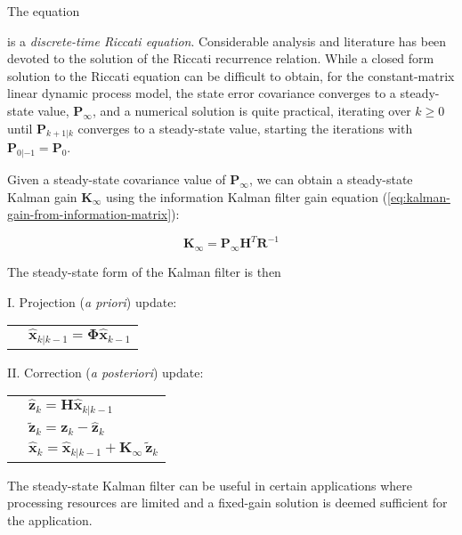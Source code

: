 The equation


is a \textit{discrete-time Riccati equation}. Considerable analysis and literature has
been devoted to the solution of the Riccati recurrence relation. While a closed form
solution to the Riccati equation can be difficult to obtain, for the constant-matrix
linear dynamic process model, the state error covariance converges to a steady-state
value, $\mathbf{P}_{\infty}$, and a numerical solution is quite practical, iterating
over $k \ge 0$ until $\mathbf{P}_{k+1|k}$ converges to a steady-state value, starting
the iterations with $\mathbf{P}_{0|-1} = \mathbf{P}_0$.

Given a steady-state covariance value of $\mathbf{P}_{\infty}$, we can obtain a
steady-state Kalman gain $\mathbf{K}_{\infty}$ using the information Kalman filter gain
equation (\ref{eq:kalman-gain-from-information-matrix}):

\begin{equation*}
    \mathbf{K}_{\infty} = \mathbf{P}_{\infty} \mathbf{H}^T \mathbf{R}^{-1}
\end{equation*}

The steady-state form of the Kalman filter is then

I. Projection (\textit{a priori}) update:

\begingroup
\renewcommand{\arraystretch}{1.25}
\begin{tabular}{l l}
\phantom{.} & $\hat{\mathbf{x}}_{k|k-1} = \mathbf{\Phi} \hat{\mathbf{x}}_{k-1}$
\end{tabular}
\endgroup

II. Correction (\textit{a posteriori}) update:

\begingroup
\renewcommand{\arraystretch}{1.25}
\begin{tabular}{l l}
\phantom{.} & $\hat{\mathbf{z}}_k = \mathbf{H} \hat{\mathbf{x}}_{k|k-1}$ \\
\phantom{.} & $\tilde{\mathbf{z}}_k = \mathbf{z}_k - \hat{\mathbf{z}}_k$ \\
\phantom{.} & $\hat{\mathbf{x}}_k = \hat{\mathbf{x}}_{k|k-1} +\mathbf{K}_{\infty} \, \tilde{\mathbf{z}}_k$
\end{tabular}
\endgroup

The steady-state Kalman filter can be useful in certain applications where processing
resources are limited and a fixed-gain solution is deemed sufficient for the application.

